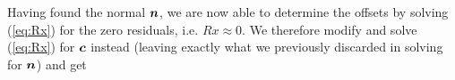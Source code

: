 

Having found the normal $\boldsymbol{n}$, we are now able to determine the offsets by solving (\ref{eq:Rx}) for the  zero residuals, i.e. $Rx \approx 0$.  We therefore modify and solve (\ref{eq:Rx})  for $\boldsymbol{c}$ instead (leaving exactly what we previously discarded in solving for $\boldsymbol{n}$) and get

